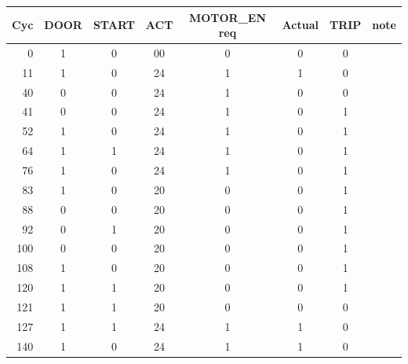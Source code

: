 \begin{tabular}{rccccccl}\toprule Cyc & DOOR & START & ACT & MOTOR\_EN req & Actual & TRIP & note \\ \midrule
0 & 1 & 0 & 00 & 0 & 0 & 0 & \\
11 & 1 & 0 & 24 & 1 & 1 & 0 & \\
40 & 0 & 0 & 24 & 1 & 0 & 0 & \\
41 & 0 & 0 & 24 & 1 & 0 & 1 & \\
52 & 1 & 0 & 24 & 1 & 0 & 1 & \\
64 & 1 & 1 & 24 & 1 & 0 & 1 & \\
76 & 1 & 0 & 24 & 1 & 0 & 1 & \\
83 & 1 & 0 & 20 & 0 & 0 & 1 & \\
88 & 0 & 0 & 20 & 0 & 0 & 1 & \\
92 & 0 & 1 & 20 & 0 & 0 & 1 & \\
100 & 0 & 0 & 20 & 0 & 0 & 1 & \\
108 & 1 & 0 & 20 & 0 & 0 & 1 & \\
120 & 1 & 1 & 20 & 0 & 0 & 1 & \\
121 & 1 & 1 & 20 & 0 & 0 & 0 & \\
127 & 1 & 1 & 24 & 1 & 1 & 0 & \\
140 & 1 & 0 & 24 & 1 & 1 & 0 & \\
\bottomrule\end{tabular}
